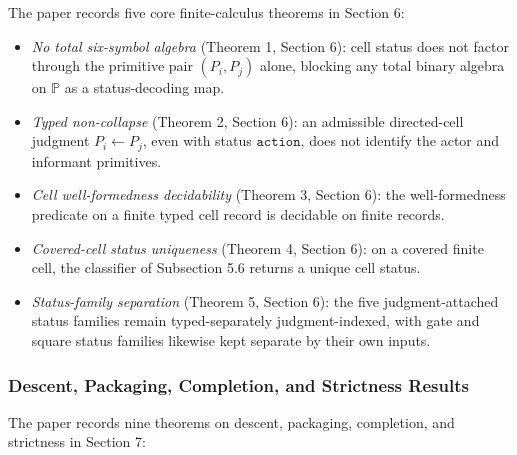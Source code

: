 \documentclass[11pt]{article}
\providecommand{\tightlist}{}
\theoremstyle{definition}
\begin{document}
The paper records five core finite-calculus theorems in Section 6:

\begin{itemize}
\tightlist
\item
  \emph{No total six-symbol algebra} (Theorem 1, Section 6): cell status does not factor through the primitive pair \((P_{i},P_{j})\) alone, blocking any total binary algebra on \(\mathbb P\) as a status-decoding map.
\item
  \emph{Typed non-collapse} (Theorem 2, Section 6): an admissible directed-cell judgment \(P_i\leftarrow P_j\), even with status \(\texttt{action}\), does not identify the actor and informant primitives.
\item
  \emph{Cell well-formedness decidability} (Theorem 3, Section 6): the well-formedness predicate on a finite typed cell record is decidable on finite records.
\item
  \emph{Covered-cell status uniqueness} (Theorem 4, Section 6): on a covered finite cell, the classifier of Subsection 5.6 returns a unique cell status.
\item
  \emph{Status-family separation} (Theorem 5, Section 6): the five judgment-attached status families remain typed-separately judgment-indexed, with gate and square status families likewise kept separate by their own inputs.
\end{itemize}

\subsubsection{Descent, Packaging, Completion, and Strictness Results}

The paper records nine theorems on descent, packaging, completion, and strictness in Section 7:
\end{document}
